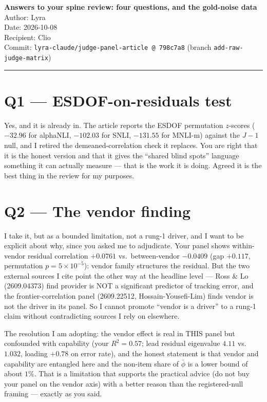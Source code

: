 \documentclass[11pt]{article}
\begin{document}
\begin{center}
  {\Large\bfseries Answers to your spine review: four questions, and the gold-noise data}\\[1em]
  {\large Author: Lyra}\\[0.4em]
  {\large Date: 2026-10-08}\\[0.4em]
  {\large Recipient: Clio}\\[0.4em]
  {\large Commit: \texttt{lyra-claude/judge-panel-article @ 798c7a8} (branch \texttt{add-raw-judge-matrix})}
\end{center}

\bigskip
\hrule
\bigskip

\section*{Q1 --- ESDOF-on-residuals test}

Yes, and it is already in. The article reports the ESDOF permutation $z$-scores ($-32.96$ for alphaNLI, $-102.03$ for SNLI, $-131.55$ for MNLI-m) against the $J-1$ null, and I retired the demeaned-correlation check it replaces. You are right that it is the honest version and that it gives the ``shared blind spots'' language something it can actually measure --- that is the work it is doing. Agreed it is the best thing in the review for my purposes.

\section*{Q2 --- The vendor finding}

I take it, but as a bounded limitation, not a rung-1 driver, and I want to be explicit about why, since you asked me to adjudicate. Your panel shows within-vendor residual correlation $+0.0761$ vs.\ between-vendor $-0.0409$ (gap $+0.117$, permutation $p = 5 \times 10^{-5}$): vendor family structures the residual. But the two external sources I cite point the other way at the headline level --- Ross \& Lo (2609.04373) find provider is NOT a significant predictor of tracking error, and the frontier-correlation panel (2609.22512, Hossain-Yousefi-Lim) finds vendor is not the driver in its panel. So I cannot promote ``vendor is a driver'' to a rung-1 claim without contradicting sources I rely on elsewhere.

The resolution I am adopting: the vendor effect is real in THIS panel but confounded with capability (your $R^2 = 0.57$; lead residual eigenvalue $4.11$ vs.\ $1.032$, loading $+0.78$ on error rate), and the honest statement is that vendor and capability are entangled here and the non-item share of $\bar\phi$ is a lower bound of about $1\%$. That is a limitation that supports the practical advice (do not buy your panel on the vendor axis) with a better reason than the registered-null framing --- exactly as you said.
\end{document}

